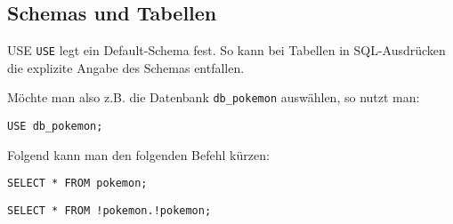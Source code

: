 \subsection{Schemas und Tabellen}

\begin{sql}{USE}
    \texttt{USE} legt ein Default-Schema fest.
    So kann bei Tabellen in SQL-Ausdrücken die explizite Angabe des Schemas entfallen.

    Möchte man also z.B. die Datenbank \texttt{db\_pokemon} auswählen, so nutzt man:

    \begin{lstlisting}[language=mysql]
        USE db_pokemon;
    \end{lstlisting}

    Folgend kann man den folgenden Befehl kürzen:

    \begin{lstlisting}[language=mysql]
        SELECT * FROM pokemon;
    \end{lstlisting}

    \begin{lstlisting}[language=mysql]
        SELECT * FROM !pokemon.!pokemon;
    \end{lstlisting}
\end{sql}

